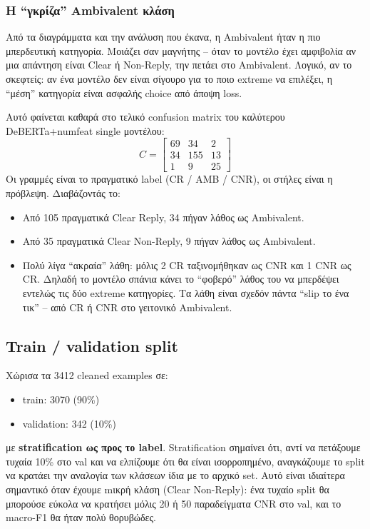 \documentclass[12pt]{fphw}
\begin{document}
\subsubsection{Η ``γκρίζα'' Ambivalent κλάση}

Από τα διαγράμματα και την ανάλυση που έκανα, η Ambivalent ήταν η πιο μπερδευτική κατηγορία. Μοιάζει σαν μαγνήτης -- όταν το μοντέλο έχει αμφιβολία αν μια απάντηση είναι Clear ή Non-Reply, την πετάει στο Ambivalent. Λογικό, αν το σκεφτείς: αν ένα μοντέλο δεν είναι σίγουρο για το ποιο extreme να επιλέξει, η ``μέση'' κατηγορία είναι ασφαλής choice από άποψη loss.

Αυτό φαίνεται καθαρά στο τελικό confusion matrix του καλύτερου DeBERTa+numfeat single μοντέλου:
\[
C = \begin{bmatrix}
69 & 34 & 2 \\
34 & 155 & 13 \\
1 & 9 & 25
\end{bmatrix}
\]
Οι γραμμές είναι το πραγματικό label (CR / AMB / CNR), οι στήλες είναι η πρόβλεψη. Διαβάζοντάς το:
\begin{itemize}
    \item Από 105 πραγματικά Clear Reply, 34 πήγαν λάθος ως Ambivalent.
    \item Από 35 πραγματικά Clear Non-Reply, 9 πήγαν λάθος ως Ambivalent.
    \item Πολύ λίγα ``ακραία'' λάθη: μόλις 2 CR ταξινομήθηκαν ως CNR και 1 CNR ως CR. Δηλαδή το μοντέλο σπάνια κάνει το ``φοβερό'' λάθος του να μπερδέψει εντελώς τις δύο extreme κατηγορίες. Τα λάθη είναι σχεδόν πάντα ``slip το ένα τικ'' -- από CR ή CNR στο γειτονικό Ambivalent.
\end{itemize}

\subsection{Train / validation split}

Χώρισα τα 3412 cleaned examples σε:
\begin{itemize}
    \item train: 3070 (90\%)
    \item validation: 342 (10\%)
\end{itemize}
με \textbf{stratification ως προς το label}. Stratification σημαίνει ότι, αντί να πετάξουμε τυχαία 10\% στο val και να ελπίζουμε ότι θα είναι ισορροπημένο, αναγκάζουμε το split να κρατάει την αναλογία των κλάσεων ίδια με το αρχικό set. Αυτό είναι ιδιαίτερα σημαντικό όταν έχουμε mικρή κλάση (Clear Non-Reply): ένα τυχαίο split θα μπορούσε εύκολα να κρατήσει μόλις 20 ή 50 παραδείγματα CNR στο val, και το macro-F1 θα ήταν πολύ θορυβώδες.
\end{document}
